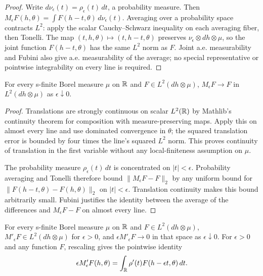 \begin{proof}
\leanok
Write $d\nu_\epsilon(t)=\rho_\epsilon(t)\,dt$, a probability measure. Then
$M_\epsilon F(h,\theta)=\int F(h-t,\theta)\,d\nu_\epsilon(t)$.
Averaging over a probability space contracts $L^2$: apply the scalar
Cauchy--Schwarz inequality on each averaging fiber, then Tonelli.
The map $(t,h,\theta)\mapsto(t,h-t,\theta)$ preserves
$\nu_\epsilon\otimes dh\otimes\mu$, so the joint function
$F(h-t,\theta)$ has the same $L^2$ norm as $F$. Joint a.e. measurability
and Fubini also give a.e. measurability of the average; no special
representative or pointwise integrability on every line is required.
\end{proof}

\begin{lemma}
\label{lem:line-mollifier-convergence}
\leanok
For every s-finite Borel measure $\mu$ on $\mathbb{R}$ and
$F\in L^2(dh\otimes\mu)$, $M_\epsilon F\to F$ in $L^2(dh\otimes\mu)$
as $\epsilon\downarrow0$.
\end{lemma}

\begin{proof}
\leanok
Translations are strongly continuous on scalar $L^2(\mathbb{R})$ by Mathlib's
continuity theorem for composition with measure-preserving maps. Apply this
on almost every line and use dominated convergence in $\theta$; the squared
translation error is bounded by four times the line's squared $L^2$ norm.
This proves continuity of translation in the first variable without any
local-finiteness assumption on $\mu$.

The probability measure $\rho_\epsilon(t)\,dt$ is concentrated on
$|t|<\epsilon$. Probability averaging and Tonelli therefore bound
$\|M_\epsilon F-F\|_2$ by any uniform bound for
$\|F(h-t,\theta)-F(h,\theta)\|_2$ on $|t|<\epsilon$.
Translation continuity makes this bound arbitrarily small. Fubini justifies
the identity between the average of the differences and $M_\epsilon F-F$
on almost every line.
\end{proof}

\begin{lemma}
\label{lem:line-mollifier-cancellation}
\leanok
For every s-finite Borel measure $\mu$ on $\mathbb{R}$ and $F\in L^2(dh\otimes\mu)$,
$M'_\epsilon F\in L^2(dh\otimes\mu)$ for $\epsilon>0$, and
$\epsilon M'_\epsilon F\to0$ in that space as $\epsilon\downarrow0$.
For $\epsilon>0$ and any function $F$, rescaling gives the pointwise identity
\[
  \epsilon M'_\epsilon F(h,\theta)
    =\int_{\mathbb{R}}\rho'(t)F(h-\epsilon t,\theta)\,dt.
\]
\end{lemma}

